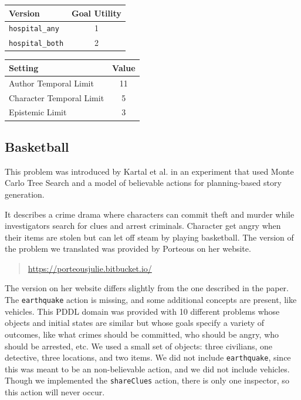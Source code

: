 \documentclass{nilreport}
\makeatletter
\renewcommand{\bibentry}[1]{\nocite{#1}{\frenchspacing\@nameuse{BR@r@#1\@extra@b@citeb}}}
\makeatother
\begin{document}
\medskip{}

\begin{center}
\begin{tabular}[t]{|l|c|}
\hline 
\textbf{Version} & \textbf{Goal Utility}\tabularnewline
\hline 
\hline 
\texttt{hospital\_any} & 1\tabularnewline
\hline 
\texttt{hospital\_both} & 2\tabularnewline
\hline 
\end{tabular}\textbf{\quad{}}%
\begin{tabular}[t]{|l|c|}
\hline 
\textbf{Setting} & \textbf{Value}\tabularnewline
\hline 
\hline 
Author Temporal Limit & 11\tabularnewline
\hline 
Character Temporal Limit & 5\tabularnewline
\hline 
Epistemic Limit & 3\tabularnewline
\hline 
\end{tabular}
\par\end{center}

\subsection{Basketball}

This problem was introduced by Kartal et al. in an experiment that
used Monte Carlo Tree Search and a model of believable actions for
planning-based story generation.

\begin{quote}
	\bibentry{kartal2014user}
\end{quote}

\noindent It describes a crime drama where characters can commit theft
and murder while investigators search for clues and arrest criminals.
Character get angry when their items are stolen but can let off steam
by playing basketball. The version of the problem we translated was
provided by Porteous on her website.

\begin{quote}
	\url{https://porteousjulie.bitbucket.io/}
\end{quote}

\noindent The version on her website differs slightly from the one
described in the paper. The \texttt{earthquake} action is missing,
and some additional concepts are present, like vehicles. This PDDL
domain was provided with 10 different problems whose objects and initial
states are similar but whose goals specify a variety of outcomes,
like what crimes should be committed, who should be angry, who should
be arrested, etc. We used a small set of objects: three civilians,
one detective, three locations, and two items. We did not include
\texttt{earthquake}, since this was meant to be an non-believable
action, and we did not include vehicles. Though we implemented the
\texttt{shareClues} action, there is only one inspector, so this action
will never occur.
\end{document}
